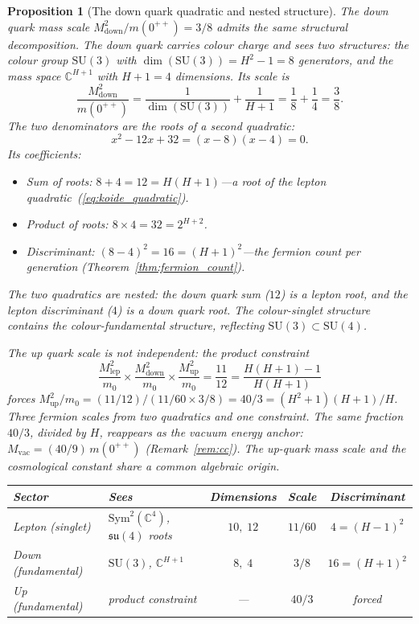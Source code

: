 \documentclass[11pt,a4paper]{article}
\newtheorem{proposition}[theorem]{Proposition}
\theoremstyle{definition}
\theoremstyle{remark}
\newcommand{\C}{\mathbb{C}}
\newcommand{\SU}{\mathrm{SU}}
\newcommand{\su}{\mathfrak{su}}
\begin{document}
\begin{proposition}[The down quark quadratic and nested structure]\label{prop:down_quadratic}
The down quark mass scale $M^2_{\mathrm{down}}/m(0^{++})=3/8$ admits the same structural decomposition. The down quark carries colour charge and sees two structures: the colour group $\SU(3)$ with $\dim(\SU(3))=H^2-1=8$ generators, and the mass space $\C^{H+1}$ with $H+1=4$ dimensions. Its scale is
\begin{equation}\label{eq:down_scale}
\frac{M^2_{\mathrm{down}}}{m(0^{++})}=\frac{1}{\dim(\SU(3))}+\frac{1}{H+1}=\frac{1}{8}+\frac{1}{4}=\frac{3}{8}.
\end{equation}
The two denominators are the roots of a second quadratic:
\begin{equation}\label{eq:down_quadratic}
x^2-12x+32=(x-8)(x-4)=0.
\end{equation}
Its coefficients:
\begin{itemize}[nosep]
\item \emph{Sum of roots:} $8+4=12=H(H+1)$---a root of the lepton quadratic~(\ref{eq:koide_quadratic}).
\item \emph{Product of roots:} $8\times 4=32=2^{H+2}$.
\item \emph{Discriminant:} $(8-4)^2=16=(H+1)^2$---the fermion count per generation (Theorem~\ref{thm:fermion_count}).
\end{itemize}
The two quadratics are nested: the down quark sum ($12$) is a lepton root, and the lepton discriminant ($4$) is a down quark root. The colour-singlet structure contains the colour-fundamental structure, reflecting $\SU(3)\subset\SU(4)$.

The up quark scale is not independent: the product constraint
\begin{equation}\label{eq:product_scales}
\frac{M^2_{\mathrm{lep}}}{m_0}\times\frac{M^2_{\mathrm{down}}}{m_0}\times\frac{M^2_{\mathrm{up}}}{m_0}=\frac{11}{12}=\frac{H(H+1)-1}{H(H+1)}
\end{equation}
forces $M^2_{\mathrm{up}}/m_0=(11/12)/(11/60\times 3/8)=40/3=(H^2+1)(H+1)/H$. Three fermion scales from two quadratics and one constraint. The same fraction $40/3$, divided by $H$, reappears as the vacuum energy anchor: $M_{\mathrm{vac}}=(40/9)\,m(0^{++})$ (Remark~\ref{rem:cc}). The up-quark mass scale and the cosmological constant share a common algebraic origin.

\begin{center}
\begin{tabular}{llccc}
\toprule
Sector & Sees & Dimensions & Scale & Discriminant \\
\midrule
Lepton (singlet) & $\mathrm{Sym}^2(\C^4)$, $\su(4)$ roots & $10,\;12$ & $11/60$ & $4=(H\!-\!1)^2$ \\
Down (fundamental) & $\SU(3)$, $\C^{H+1}$ & $8,\;4$ & $3/8$ & $16=(H\!+\!1)^2$ \\
Up (fundamental) & product constraint & --- & $40/3$ & forced \\
\bottomrule
\end{tabular}
\end{center}
\end{proposition}
\end{document}
